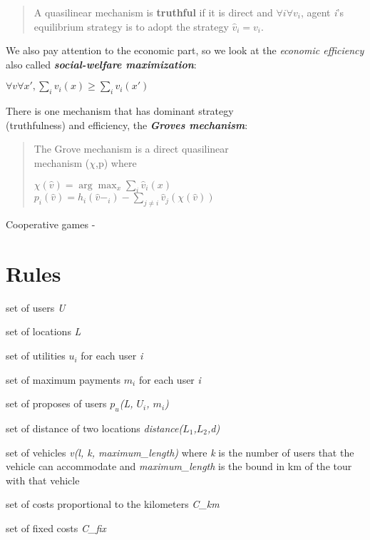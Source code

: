 \documentclass{article}
\begin{document}
{\begin{quote}
    A quasilinear mechanism is \textbf{truthful} if it is direct and $\forall i \forall v_i$, agent \textit{i}'s equilibrium strategy is to adopt the strategy $\hat{v}_i = v_i$.
\end{quote}
We also pay attention to the economic part, so we look at the \textit{economic efficiency} also called \textit{\textbf{social-welfare maximization}}:
\begin{center}
    $\forall v \forall x', \sum_{i} v_i(x) \ge \sum_{i} v_i(x')$
\end{center}
There is one mechanism that has dominant strategy \\(truthfulness) and efficiency, the \textit{\textbf{Groves mechanism}}:
\begin{quote}
    The Grove mechanism is a direct quasilinear \\mechanism ($\chi$,p) where
    \begin{center}
        $\chi(\hat{v}) = \arg \max_{x} \sum_{i} \hat{v}_i(x)$\\
        $p_i(\hat{v}) = h_i(\hat{v}-_i) - \sum_{j \ne i} \hat{v}_j(\chi(\hat{v}))$
    \end{center}
\end{quote}
Cooperative games -
}\newpage
\section{Rules}
\begin{itemize}
\Large{
\item set of users \textit{U}
\item set of locations \textit{L}
\item set of utilities \textit{$u_i$} for each user \textit{i}
\item set of maximum payments \textit{$m_i$} for each user \textit{i}
\item set of proposes of users \textit{$p_u$(L, $U_i$, $m_i$)}
\item set of distance of two locations \textit{distance($L_1$,$L_2$,d)}
\item set of vehicles \textit{v(l, k, maximum\_length)} where \textit{k} is the number of users that the vehicle can accommodate and \textit{maximum\_length} is the bound in km of the tour with that vehicle   
}
\item set of costs proportional to the kilometers \textit{C\_km}
\item set of fixed costs \textit{C\_fix}
\end{itemize}
\end{document}

